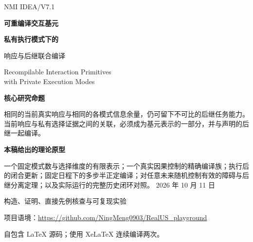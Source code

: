 \documentclass[UTF8,fontset=fandol,11pt,a4paper]{ctexart}
\theoremstyle{definition}
\theoremstyle{remark}
\numberwithin{equation}{section}
\begin{document}
\begin{titlepage}
\vspace*{8mm}
{\color{teal}\sffamily\Large NMI IDEA\quad /\quad V7.1}\par
\vspace{12mm}
{\Huge\bfseries\color{ink}可重编译交互基元}\par
\vspace{5mm}
{\LARGE\bfseries\color{ink}私有执行模式下的\par 响应与后继联合编译}\par
\vspace{5mm}
{\large\color{muted}Recompilable Interaction Primitives\\
 with Private Execution Modes}\par
\vspace{11mm}
\begin{keybox}
\textbf{核心研究命题}\par
相同的当前真实响应与相同的各模式信息余量，仍可留下不可比的后继任务能力。
当前响应与私有选择证据之间的关联，必须成为基元表示的一部分，并与声明的后继一起编译。
\end{keybox}
\vspace{5mm}
\textbf{本稿给出的理论原型}\par
一个固定模式数与选择维度的有限表示；一个真实因果控制的精确编译族；执行后的闭合更新；固定日程下的多步半正定编译；对任意未来随机控制有效的障碍与后继分离定理；以及实际运行的完整历史闭环对照。
\vfill
{\large 2026 年 10 月 11 日}\par
{\color{muted}构造、证明、直接先例核查与可复现实验}\par
\vspace{6mm}
{\small 项目语境：\url{https://github.com/NingMeng0903/RealUS_playground}\par
 自包含 LaTeX 源码；使用 XeLaTeX 连续编译两次。}
\end{titlepage}

\begin{abstract}
交互技能常根据探查证据选择真实接触、传感或执行模式。模式既携带关于未知环境的信息，又影响后续实验；仅匹配当前响应或保存各模式的信息矩阵，不能确定原先的后继是否仍可实现。
本稿以跨段共享的固定未知参数为基础，构造一个选择关联的交互基元：它保留持久物理模式、选择证据与规范得分的有限联合表示，所有保证逐参数成立。
第一，针对一般自适应高斯实验，给出逐路径信息矩阵下界仍不足以提取所需响应的二维反例；在两模式剩余像空间相交为零时，证明任意随机提取核存在的精确条件是选择信息 $G$ 被目标信息 $D$ 支配。
第二，对共同选择--响应高斯联合表示的物理实现族，给出关于可设计关联矩阵 $C$ 的半正定充要条件、显式因果控制和执行后的闭合更新。
第三，证明两个当前实现可具有相同的真实响应与相同的各模式信息余量，却留下不可比的真实后继任务域；错误方向的任务对任意读取完整记录的未来因果随机控制都不可实现。
第四，将固定矩阵与观测到达日程下的全部后续合同化为一个有限 SDP，并从已经执行的前缀直接重编译。
数值原型验证了真实私有模式下的完整反馈路径、正确完整历史基线与紧凑状态的逐样本等价，以及任务改变后真实探查和反馈增益的共同变化。
选择高斯滤波、高斯实验比较、数据拆分和一般策略精化均作为已有基础；候选创新集中于选择关联所决定的后继任务取舍及其可计算编译。超声是这一接口的一类待验证应用，理论不依赖人体大规模训练数据。
\end{abstract}
\end{document}
